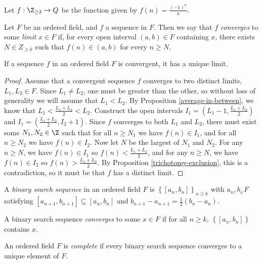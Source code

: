 \documentclass[12pt]{article}
\begin{document}
\begin{exmp}
    Let $f: \Z_{\geq 3} \to Q$ be the function given by $f(n) = \frac{(-1)^n}{n}$.
\end{exmp}

\begin{defn}
    Let $F$ be an ordered field, and $f$ a sequence in $F$. Then we say that $f$ \emph{converges} to some \emph{limit} $x \in F$ if, for every open interval $(a, b) \in F$ containing $x$, there exists $N \in Z_{\geq k}$ such that $f(n) \in (a, b)$ for every $n \geq N$.
\end{defn}

\begin{thm}
    If a sequence $f$ in an ordered field $F$ is convergent, it has a unique limit.
\end{thm}

\begin{proof}
    Assume that a convergent sequence $f$ converges to two distinct limits, $L_1, L_2 \in F$. Since $L_1 \neq L_2$, one must be greater than the other, so without loss of generality we will assume that $L_1 < L_2$. By Proposition \ref{average-in-between}, we know that $L_1 < \frac{L_1+L_2}{2} < L_2$. Construct the open intervals $I_1 = (L_1 - 1, \frac{L_1+L_2}{2})$ and $I_1 = (\frac{L_1+L_2}{2}, I_2 + 1)$. Since $f$ converges to both $L_1$ and $L_2$, there must exist some $N_1, N_2 \in \Z$ such that for all $n \geq N_1$ we have $f(n) \in I_1$, and for all $n \geq N_2$ we have $f(n) \in I_2$. Now let $N$ be the largest of $N_1$ and $N_2$. For any $n \geq N$, we have $f(n) \in I_1$ so $f(n) < \frac{L_1+L_2}{2}$, and for any $n \geq N$, we have $f(n) \in I_2$ so $f(n) > \frac{L_1+L_2}{2}$. By Proposition \ref{trichotomy-exclusion}, this is a contradiction, so it must be that $f$ has a distinct limit.
\end{proof}

\begin{defn}
    A \emph{binary search sequence} in an ordered field $F$ is $\left\{[a_n, b_n]\right\}_{n \geq k}$ with $a_n, b_ \in F$ satisfying $[a_{n+1}, b_{n+1}] \subseteq [a_n, b_n]$ and $b_{n+1}-a_{n+1} = \frac{1}{2}(b_n - a_n)$.
\end{defn}

\begin{defn}
    A binary search sequence \emph{converges} to some $x \in F$ if for all $n \geq k$, $\left\{[a_n, b_n]\right\}$ contains $x$.
\end{defn}

\begin{defn}
    An ordered field $F$ is \emph{complete} if every binary search sequence converges to a unique element of $F$.
\end{defn}
\end{document}
